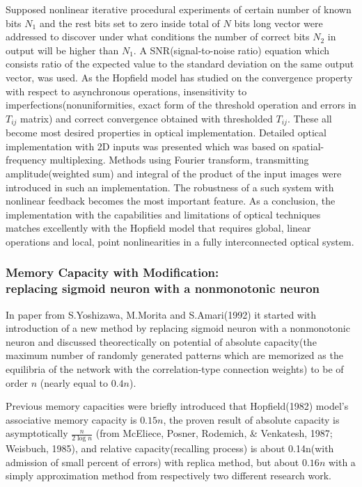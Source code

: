 Supposed nonlinear iterative procedural experiments of certain number of known bits $N_1$ and the rest bits set to zero inside total of $N$ bits long vector were addressed to discover under what conditions the number of correct bits $N_2$ in output will be higher than $N_1$. A SNR(signal-to-noise ratio) equation which consists ratio of the expected value to the standard deviation on the same output vector, was used. As the Hopfield model has studied on the convergence property with respect to asynchronous operations, insensitivity to imperfections(nonuniformities, exact form of the threshold operation and errors in $T_{ij}$ matrix) and correct convergence obtained with thresholded $T_{ij}$. These all become most desired properties in optical implementation. Detailed optical implementation with 2D inputs was presented which was based on spatial-frequency multiplexing. Methods using Fourier transform, transmitting amplitude(weighted sum) and integral of the product of the input images were introduced in such an implementation. The robustness of a such system with nonlinear feedback becomes the most important feature.
As a conclusion, the implementation with the capabilities and limitations of optical techniques matches excellently with the Hopfield model that requires global, linear operations and local, point nonlinearities in a fully interconnected optical system.

\subsubsection{Memory Capacity with Modification: \\ replacing sigmoid neuron with a nonmonotonic neuron}
In paper from S.Yoshizawa, M.Morita and S.Amari(1992) \cite{capacity_of_nonmonotonic_model} it started with introduction of a new method by replacing sigmoid neuron with a nonmonotonic neuron and discussed theorectically on potential of absolute capacity(the maximum number of randomly generated patterns which are memorized as the equilibria of the network with the correlation-type connection weights) to be of order $n$ (nearly equal to $0.4n$).

Previous memory capacities were briefly introduced that Hopfield(1982) model's associative memory capacity is $0.15n$, the proven result of absolute capacity is asymptotically $ \frac{n}{2\log{n}} $ (from McEliece, Posner, Rodemich, \& Venkatesh, 1987; Weisbuch, 1985), and relative capacity(recalling process) is about 0.14n(with admission of small percent of errors) with replica method, but about $0.16n$ with a simply approximation method from respectively two different research work.

